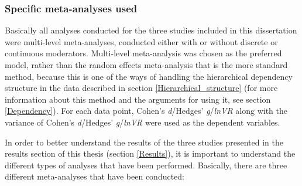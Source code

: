 \subsubsection{Specific meta-analyses used} \label{Specific_meta-analyses} Basically all analyses conducted for the three studies included in this dissertation were multi-level meta-analyses, conducted either with or without discrete or continuous moderators. Multi-level meta-analysis was chosen as the preferred model, rather than the random effects meta-analysis that is the more standard method, because this is one of the ways of handling the hierarchical dependency structure in the data described in section \ref{Hierarchical_structure} (for more information about this method and the arguments for using it, see section \ref{Dependency}). For each data point, Cohen's \emph{d}/Hedges' \emph{g}/\emph{lnVR} along with the variance of Cohen's \emph{d}/Hedges' \emph{g}/\emph{lnVR} were used as the dependent variables.

In order to better understand the results of the three studies presented in the results section of this thesis (section \ref{Results}), it is important to understand the different types of analyses that have been performed. Basically, there are three different meta-analyses that have been conducted:

